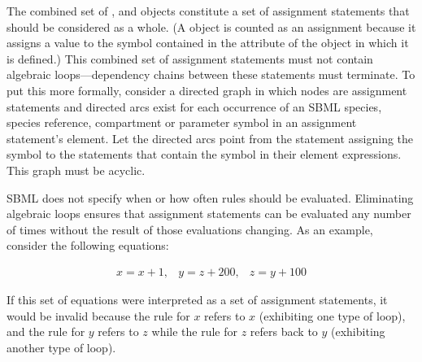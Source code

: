 The combined set of \InitialAssignment, \AssignmentRule and
\KineticLaw objects constitute a set of assignment statements that
should be considered as a whole.  (A \KineticLaw object is counted
as an assignment because it assigns a value to the symbol
contained in the  attribute of the \Reaction object in which
it is defined.)  This combined set of assignment statements must
not contain algebraic loops---dependency chains between these
statements must terminate.  To put this more formally, consider a
directed graph in which nodes are assignment statements and
directed arcs exist for each occurrence of an SBML species, species reference,
compartment or parameter symbol in an assignment statement's
 element.  Let the directed arcs point from the
statement assigning the symbol to the statements that contain the
symbol in their  element expressions.  This graph must
be acyclic.



SBML does not specify when or how often rules should be evaluated.
Eliminating algebraic loops ensures that assignment statements can
be evaluated any number of times without the result of those
evaluations changing.  As an example, consider the following
equations:
\begin{linenomath}
\begin{equation*}
  \begin{array}{lll}
    x = x + 1, & y = z + 200, & z = y + 100
  \end{array}
\end{equation*}
\end{linenomath}
If this set of equations were interpreted as a set of assignment
statements, it would be invalid because the rule for $x$ refers to
$x$ (exhibiting one type of loop), and the rule for $y$ refers to
$z$ while the rule for $z$ refers back to $y$ (exhibiting another
type of loop).

